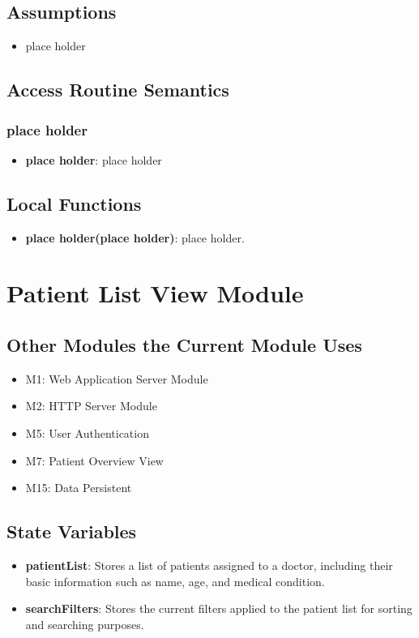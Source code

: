 \documentclass[12pt, titlepage]{article}
\begin{document}
\subsection{Assumptions}
\begin{itemize}
\item place holder
\end{itemize}

\subsection{Access Routine Semantics}
\subsubsection{place holder}
\begin{itemize}
    \item \textbf{place holder}: place holder
\end{itemize}

\subsection{Local Functions}
\begin{itemize}
\item \textbf{place holder(place holder)}: place holder.
\end{itemize}

\section{Patient List View Module}

\subsection{Other Modules the Current Module Uses}
\begin{itemize}
    \item M1: Web Application Server Module
    \item M2: HTTP Server Module
    \item M5: User Authentication
    \item M7: Patient Overview View
    \item M15: Data Persistent
\end{itemize}

\subsection{State Variables}
\begin{itemize}
\item \textbf{patientList}: Stores a list of patients assigned to a doctor, including their basic information such as name, age, and medical condition.
\item \textbf{searchFilters}: Stores the current filters applied to the patient list for sorting and searching purposes.
\end{itemize}
\end{document}
